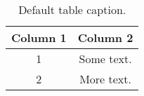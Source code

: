 \documentclass[../main.tex]{subfiles}%
\begin{document}
%
    \Xtable%
    \begin{table}%
        \caption{Default table caption.}%
        \label{tbl:default}%
        \begin{tabu}{ c c }%
            \toprule%
            \centering\textbf{Column 1} &%
            \centering\textbf{Column 2}\\%
            \toprule%
            1 &%
            Some text.\\%
            \midrule%
            2 &%
            More text.\\%
            \bottomrule%
        \end{tabu}%
    \end{table}%
\end{document}

